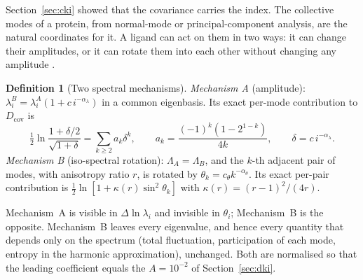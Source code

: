 \documentclass[11pt,reqno]{amsart}
\theoremstyle{plain}
\theoremstyle{definition}
\newtheorem{definition}[theorem]{Definition}
\theoremstyle{remark}
\numberwithin{equation}{section}
\begin{document}
Section~\ref{sec:cki} showed that the covariance carries the index. The collective modes of a protein, from normal-mode or principal-component analysis, are the natural coordinates for it. A ligand can act on them in two ways: it can change their amplitudes, or it can rotate them into each other without changing any amplitude \cite{ChenChen2026III}.

\begin{definition}[Two spectral mechanisms]\label{def:mech}
\emph{Mechanism A} (amplitude): $\lambda^B_i=\lambda^A_i(1+c\,i^{-\alpha_\lambda})$ in a common eigenbasis. Its exact per-mode contribution to $D_{\mathrm{cov}}$ is
\[
\tfrac12\ln\frac{1+\delta/2}{\sqrt{1+\delta}}=\sum_{k\ge2}a_k\delta^k,\qquad a_k=\frac{(-1)^k(1-2^{1-k})}{4k},\qquad\delta=c\,i^{-\alpha_\lambda}.
\]
\emph{Mechanism B} (iso-spectral rotation): $\Lambda_A=\Lambda_B$, and the $k$-th adjacent pair of modes, with anisotropy ratio $r$, is rotated by $\theta_k=c_\theta k^{-\alpha_\theta}$. Its exact per-pair contribution is $\tfrac12\ln[1+\kappa(r)\sin^2\theta_k]$ with $\kappa(r)=(r-1)^2/(4r)$.
\end{definition}

Mechanism~A is visible in $\Delta\ln\lambda_i$ and invisible in $\theta_i$; Mechanism~B is the opposite. Mechanism~B leaves every eigenvalue, and hence every quantity that depends only on the spectrum (total fluctuation, participation of each mode, entropy in the harmonic approximation), unchanged. Both are normalised so that the leading coefficient equals the $A=10^{-2}$ of Section~\ref{sec:dki}.
\end{document}
